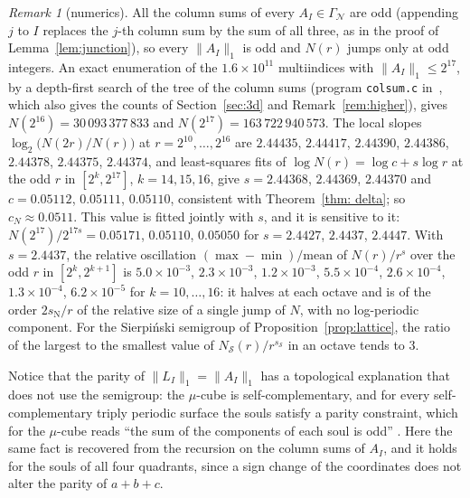 \documentclass[11pt]{amsart}
\theoremstyle{definition}
\theoremstyle{remark}
\newtheorem{remark}[proposition]{Remark}
\newcommand{\GN}{\Gamma_{\mathcal N}}
\newcommand{\sN}{s_{\mathrm N}}
\newcommand{\norm}[1]{\lVert #1\rVert}
\begin{document}
\begin{remark}[numerics]\label{rem:countnum}
All the column sums of every $A_I\in\GN$ are odd (appending $j$ to $I$ replaces the $j$-th column sum by the sum of all three, as in the proof of Lemma~\ref{lem:junction}), so every $\norm{A_I}_1$ is odd and $N(r)$ jumps only at odd integers. An exact enumeration of the $1.6\times10^{11}$ multiindices with $\norm{A_I}_1\le2^{17}$, by a depth-first search of the tree of the column sums (program \texttt{colsum.c} in~\cite{DLdata}, which also gives the counts of Section~\ref{sec:3d} and Remark~\ref{rem:higher}), gives $N(2^{16})=30\,093\,377\,833$ and $N(2^{17})=163\,722\,940\,573$. The local slopes $\log_2\bigl(N(2r)/N(r)\bigr)$ at $r=2^{10},\dots,2^{16}$ are $2.44435$, $2.44417$, $2.44390$, $2.44386$, $2.44378$, $2.44375$, $2.44374$, and least-squares fits of $\log N(r)=\log c+s\log r$ at the odd $r$ in $[2^k,2^{17}]$, $k=14,15,16$, give $s=2.44368$, $2.44369$, $2.44370$ and $c=0.05112$, $0.05111$, $0.05110$, consistent with Theorem~\ref{thm: delta}; so $c_N\approx0.0511$. This value is fitted jointly with $s$, and it is sensitive to it: $N(2^{17})/2^{17s}=0.05171$, $0.05110$, $0.05050$ for $s=2.4427$, $2.4437$, $2.4447$. With $s=2.4437$, the relative oscillation $(\max-\min)/\mathrm{mean}$ of $N(r)/r^s$ over the odd $r$ in $[2^k,2^{k+1}]$ is $5.0\times10^{-3}$, $2.3\times10^{-3}$, $1.2\times10^{-3}$, $5.5\times10^{-4}$, $2.6\times10^{-4}$, $1.3\times10^{-4}$, $6.2\times10^{-5}$ for $k=10,\dots,16$: it halves at each octave and is of the order $2\sN/r$ of the relative size of a single jump of $N$, with no log-periodic component. For the Sierpi\'nski semigroup of Proposition~\ref{prop:lattice}, the ratio of the largest to the smallest value of $N_{\mathcal S}(r)/r^{s_{\mathcal S}}$ in an octave tends to $3$.

Notice that the parity of $\|L_I\|_1=\|A_I\|_1$ has a topological explanation that does not use the semigroup: the $\mu$-cube is self-complementary, and for every self-complementary triply periodic surface the souls satisfy a parity constraint, which for the $\mu$-cube reads “the sum of the components of each soul is odd” \cite{DL26parity}. Here the same fact is recovered from the recursion on the column sums of $A_I$, and it holds for the souls of all four quadrants, since a sign change of the coordinates does not alter the parity of $a+b+c$.
\end{remark}
\end{document}
